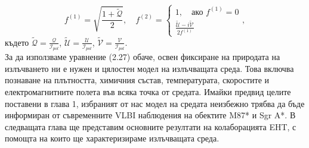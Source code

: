 \begin{equation}
	f^{(1)} = \sqrt{\frac{1 + \tilde{\mathcal{Q}}}{2}}, \quad f^{(2)} = \begin{cases}
		1,\quad \text{ако}\,\,f^{(1)} = 0 \\
		\frac{\tilde{\mathcal{U}} - i\tilde{\mathcal{V}}}{2f^{(1)}}
	\end{cases},
\end{equation}
където $\tilde{\mathcal{Q}} = \frac{\mathcal{Q}}{\mathcal{I}_{pol}}$, $\tilde{\mathcal{U}} = \frac{\mathcal{U}}{\mathcal{I}_{pol}}$, $\tilde{\mathcal{V}} = \frac{\mathcal{V}}{\mathcal{I}_{pol}}$.\\
За да използваме уравнение (2.27) обаче, освен фиксиране на природата на излъчването ни е нужен и цялостен модел на излъчващата среда. Това включва познаване на плътността, химичния състав, температурата, скоростите и електромагнитните полета във всяка точка от средата. Имайки предвид целите поставени в глава 1, избраният от нас модел на средата неизбежно трябва да бъде информиран от съвременните VLBI наблюдения на обектите M87* и Sgr A*. В следващата глава ще представим основните резултати на колаборацията EHT, с помощта на които ще характеризираме излъчващата среда.
\lfoot{}

